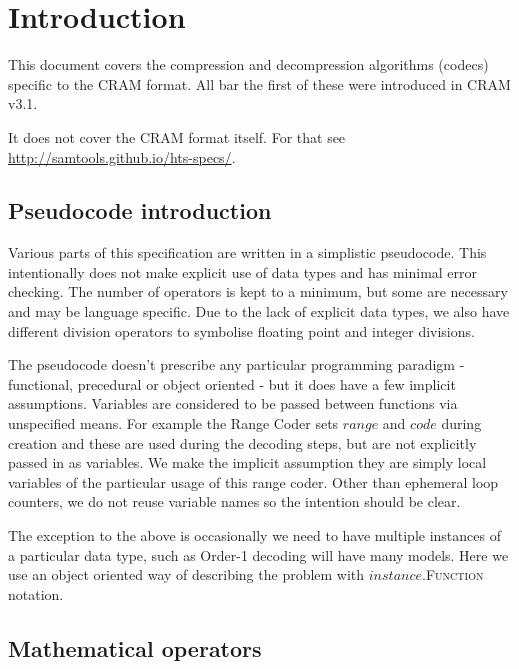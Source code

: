 \documentclass[a4paper]{article}
\begin{document}
\section{Introduction}

This document covers the compression and decompression algorithms
(codecs) specific to the CRAM format.  All bar the first of these were
introduced in CRAM v3.1.

It does not cover the CRAM format itself.  For that see \url{http://samtools.github.io/hts-specs/}.

\subsection{Pseudocode introduction}

Various parts of this specification are written in a simplistic
pseudocode.  This intentionally does not make explicit use of data
types and has minimal error checking.  The number of operators is kept
to a minimum, but some are necessary and may be language specific.
Due to the lack of explicit data types, we also have different
division operators to symbolise floating point and integer divisions.

The pseudocode doesn't prescribe any particular programming paradigm -
functional, precedural or object oriented - but it does have a few
implicit assumptions.  Variables are considered to be passed between
functions via unspecified means.  For example the Range Coder sets
$range$ and $code$ during creation and these are used during the
decoding steps, but are not explicitly passed in as variables.  We
make the implicit assumption they are simply local variables of the
particular usage of this range coder.  Other than ephemeral loop
counters, we do not reuse variable names so the intention should be
clear.

The exception to the above is occasionally we need to have multiple
instances of a particular data type, such as Order-1 decoding will
have many models.  Here we use an object oriented way of describing
the problem with $instance$.\textsc{Function} notation.

\subsection{Mathematical operators}
\end{document}
